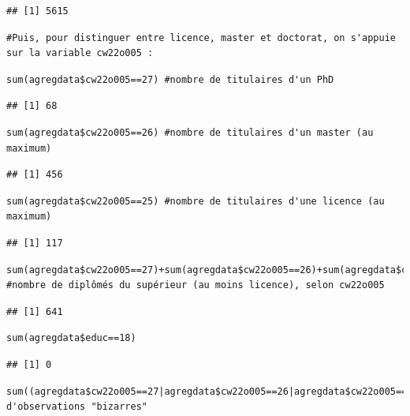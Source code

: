 \documentclass[a4paper, french, 11 pt]{article}\usepackage[]{graphicx}\usepackage[]{xcolor}
\makeatletter
\newenvironment{kframe}{%
 \def\at@end@of@kframe{}%
 \ifinner\ifhmode%
  \def\at@end@of@kframe{\end{minipage}}%
  \begin{minipage}{\columnwidth}%
 \fi\fi%
 \def\FrameCommand##1{\hskip\@totalleftmargin \hskip-\fboxsep
 \colorbox{shadecolor}{##1}\hskip-\fboxsep
     \hskip-\linewidth \hskip-\@totalleftmargin \hskip\columnwidth}%
 \MakeFramed {\advance\hsize-\width
   \@totalleftmargin\z@ \linewidth\hsize
   \@setminipage}}%
 {\par\unskip\endMakeFramed%
 \at@end@of@kframe}
\newenvironment{knitrout}{}{} %
\makeatother
\begin{document}
\begin{knitrout}
\begin{kframe}
\begin{lstlisting}[basicstyle=\ttfamily,breaklines=true]
## [1] 5615
\end{lstlisting}
\begin{lstlisting}[basicstyle=\ttfamily,breaklines=true]
#Puis, pour distinguer entre licence, master et doctorat, on s'appuie sur la variable cw22o005 :\end{lstlisting}
\begin{lstlisting}[basicstyle=\ttfamily,breaklines=true]
sum(agregdata$cw22o005==27) #nombre de titulaires d'un PhD\end{lstlisting}
\begin{lstlisting}[basicstyle=\ttfamily,breaklines=true]
## [1] 68
\end{lstlisting}
\begin{lstlisting}[basicstyle=\ttfamily,breaklines=true]
sum(agregdata$cw22o005==26) #nombre de titulaires d'un master (au maximum)\end{lstlisting}
\begin{lstlisting}[basicstyle=\ttfamily,breaklines=true]
## [1] 456
\end{lstlisting}
\begin{lstlisting}[basicstyle=\ttfamily,breaklines=true]
sum(agregdata$cw22o005==25) #nombre de titulaires d'une licence (au maximum)\end{lstlisting}
\begin{lstlisting}[basicstyle=\ttfamily,breaklines=true]
## [1] 117
\end{lstlisting}
\begin{lstlisting}[basicstyle=\ttfamily,breaklines=true]
sum(agregdata$cw22o005==27)+sum(agregdata$cw22o005==26)+sum(agregdata$cw22o005==25) #nombre de diplômés du supérieur (au moins licence), selon cw22o005\end{lstlisting}
\begin{lstlisting}[basicstyle=\ttfamily,breaklines=true]
## [1] 641
\end{lstlisting}
\begin{lstlisting}[basicstyle=\ttfamily,breaklines=true]
sum(agregdata$educ==18)\end{lstlisting}
\begin{lstlisting}[basicstyle=\ttfamily,breaklines=true]
## [1] 0
\end{lstlisting}
\begin{lstlisting}[basicstyle=\ttfamily,breaklines=true]
sum((agregdata$cw22o005==27|agregdata$cw22o005==26|agregdata$cw22o005==25)&agregdata$educ!=17)#nombre d'observations "bizarres"\end{lstlisting}
\begin{lstlisting}[basicstyle=\ttfamily,breaklines=true]

\end{lstlisting}
\end{kframe}
\end{knitrout}
\end{document}
